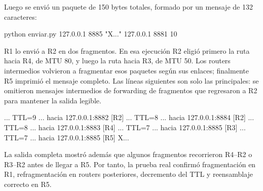 \documentclass[
	spanish, %
	letterpaper, oneside
]{article}
\begin{document}
Luego se envió un paquete de 150 bytes totales, formado por un mensaje de 132 caracteres:
\begin{salida}
python enviar.py 127.0.0.1 8885 "X..." 127.0.0.1 8881 10
\end{salida}
R1 lo envió a R2 en dos fragmentos. En esa ejecución R2 eligió primero la ruta hacia R4, de MTU 80, y luego la ruta hacia R3, de MTU 50. Los routers intermedios volvieron a fragmentar esos paquetes según sus enlaces; finalmente R5 imprimió el mensaje completo. Las líneas siguientes son solo las principales: se omitieron mensajes intermedios de forwarding de fragmentos que regresaron a R2 para mantener la salida legible.
\begin{salida}
[R1] ... TTL=9 ... hacia 127.0.0.1:8882
[R2] ... TTL=8 ... hacia 127.0.0.1:8884
[R2] ... TTL=8 ... hacia 127.0.0.1:8883
[R4] ... TTL=7 ... hacia 127.0.0.1:8885
[R3] ... TTL=7 ... hacia 127.0.0.1:8885
[R5] X...
\end{salida}
La salida completa mostró además que algunos fragmentos recorrieron R4--R2 o R3--R2 antes de llegar a R5. Por tanto, la prueba real confirmó fragmentación en R1, refragmentación en routers posteriores, decremento del TTL y reensamblaje correcto en R5.
\end{document}
